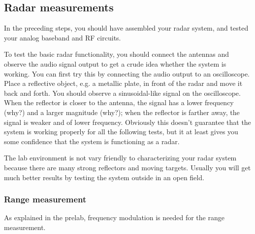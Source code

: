 \documentclass[letterpaper, 11pt]{article}
\begin{document}
\subsection{Radar measurements}

In the preceding steps, you should have assembled your radar system, and tested your analog baseband and RF circuits. 

To test the basic radar functionality, you should connect the antennas and observe the audio signal output to get a crude idea whether the system is working. You can first try this by connecting the audio output to an oscilloscope. Place a reflective object, e.g. a metallic plate, in front of the radar and move it back and forth. You should observe a sinusoidal-like signal on the oscilloscope. When the reflector is closer to the antenna, the signal has a lower frequency (why?) and a larger magnitude (why?); when the reflector is farther away, the signal is weaker and of lower frequency. Obviously this doesn't guarantee that the system is working properly for all the following tests, but it at least gives you some confidence that the system is functioning as a radar.

The lab environment is not vary friendly to characterizing your radar system because there are many strong reflectors and moving targets. Usually you will get much better results by testing the system outside in an open field. 

\subsubsection{Range measurement}

As explained in the prelab, frequency modulation is needed for the range measurement. 
\end{document}
